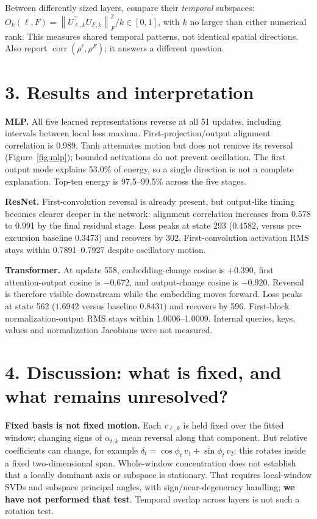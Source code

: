 \documentclass[11pt,a4paper]{article}
\newcommand{\corr}{\operatorname{corr}}
\newcommand{\norm}[1]{\left\lVert#1\right\rVert}
\newcommand{\tightsection}[1]{\vspace{3pt}\section*{#1}\vspace{-4pt}}
\begin{document}
Between differently sized layers, compare their \emph{temporal} subspaces:
$O_k(\ell,F)=\norm{U_{\ell,k}^\top U_{F,k}}_F^2/k\in[0,1]$, with $k$ no larger
than either numerical rank. This measures shared temporal patterns, not identical
spatial directions. Also report $\corr(\rho^\ell,\rho^F)$; it answers a different question.

\newpage
\tightsection{3. Results and interpretation}
\begin{table}[h]
\centering\small\setlength{\tabcolsep}{5pt}

\caption{New 450--500 MLP fit; original event windows for the other cases.
``First'' means linear projection, convolution or embedding; ``last hidden''
means tanh 2, final residual-stage output or final Transformer-block output.
Spectra are descriptive, not controlled comparisons of intrinsic dimension.}
\label{tab:results}
\end{table}

\textbf{MLP.} All five learned representations reverse at all 51 updates,
including intervals between local loss maxima. First-projection/output alignment
correlation is 0.989. Tanh attenuates motion but does not remove its reversal
(Figure~\ref{fig:mlp}); bounded activations do not prevent oscillation.
The first output mode explains 53.0\% of energy, so a single direction is not a
complete explanation. Top-ten energy is 97.5--99.5\% across the five stages.

\textbf{ResNet.} First-convolution reversal is already present, but output-like
timing becomes clearer deeper in the network: alignment correlation increases
from 0.578 to 0.991 by the final residual stage. Loss peaks at state 293
($0.4582$, versus pre-excursion baseline $0.3473$) and recovers by 302.
First-convolution activation RMS stays within 0.7891--0.7927 despite oscillatory motion.

\textbf{Transformer.} At update 558, embedding-change cosine is $+0.390$,
first attention-output cosine is $-0.672$, and output-change cosine is $-0.920$.
Reversal is therefore visible downstream while the embedding moves forward.
Loss peaks at state 562 ($1.6942$ versus baseline $0.8431$) and recovers by 596.
First-block normalization-output RMS stays within 1.0006--1.0009.
Internal queries, keys, values and normalization Jacobians were not measured.

\tightsection{4. Discussion: what is fixed, and what remains unresolved?}
\textbf{Fixed basis is not fixed motion.} Each $v_{\ell,k}$ is held fixed over
the fitted window; changing signs of $\alpha_{t,k}$ mean reversal along that
component. But relative coefficients can change, for example
$\delta_t=\cos\phi_t\,v_1+\sin\phi_t\,v_2$: this rotates inside a fixed
two-dimensional span. Whole-window concentration does not establish that a
locally dominant axis or subspace is stationary. That requires local-window
SVDs and subspace principal angles, with sign/near-degeneracy handling;
\textbf{we have not performed that test}. Temporal overlap across layers is
not such a rotation test.
\end{document}
